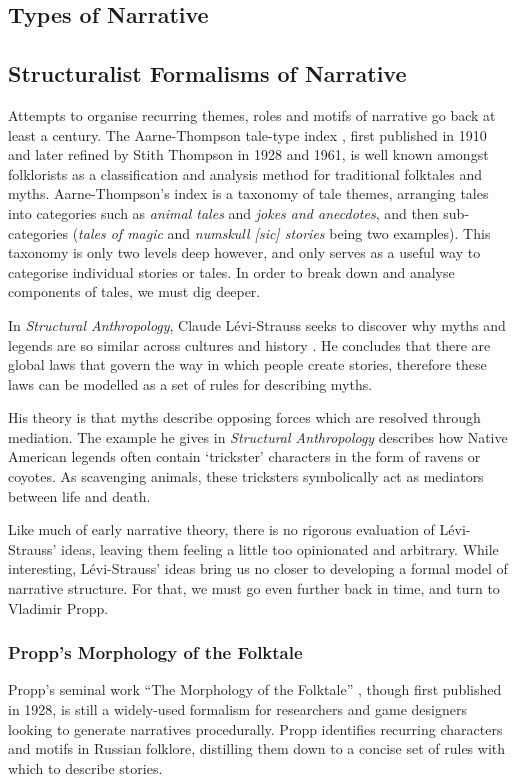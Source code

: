 \documentclass[11pt]{report}
\begin{document}
\subsection{Types of Narrative}

\subsection{Structuralist Formalisms of Narrative}
Attempts to organise recurring themes, roles and motifs of narrative go back at least a century. The Aarne-Thompson tale-type index \citep{aarne1987types}, first published in 1910 and later refined by Stith Thompson in 1928 and 1961, is well known amongst folklorists as a classification and analysis method for traditional folktales and myths. Aarne-Thompson's index is a taxonomy of tale themes, arranging tales into categories such as \emph{animal tales} and \emph{jokes and anecdotes}, and then sub-categories (\emph{tales of magic} and \emph{numskull [sic] stories} being two examples). This taxonomy is only two levels deep however, and only serves as a useful way to categorise individual stories or tales. In order to break down and analyse components of tales, we must dig deeper.

In \emph{Structural Anthropology}, Claude L\'{e}vi-Strauss seeks to discover why myths and legends are so similar across cultures and history \citep{levi2008structural}. He concludes that there are global laws that govern the way in which people create stories, therefore these laws can be modelled as a set of rules for describing myths.

His theory is that myths describe opposing forces which are resolved through mediation. The example he gives in \emph{Structural Anthropology} describes how Native American legends often contain `trickster' characters in the form of ravens or coyotes. As scavenging animals, these tricksters symbolically act as mediators between life and death.

Like much of early narrative theory, there is no rigorous evaluation of L\'{e}vi-Strauss' ideas, leaving them feeling a little too opinionated and arbitrary. While interesting, L\'{e}vi-Strauss' ideas bring us no closer to developing a formal model of narrative structure. For that, we must go even further back in time, and turn to Vladimir Propp.

\subsubsection{Propp's Morphology of the Folktale}
Propp's seminal work ``The Morphology of the Folktale'' \citep{propp1968morphology}, though first published in 1928, is still a widely-used formalism for researchers and game designers looking to generate narratives procedurally. Propp identifies recurring characters and motifs in Russian folklore, distilling them down to a concise set of rules with which to describe stories.
\end{document}
